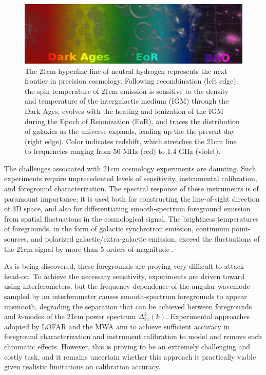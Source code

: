 \documentclass[preprint]{aastex}
\begin{document}
\begin{figure}[!ht]\centering
\includegraphics[width=6in]{plots/21cm_cosmo.jpg}
\caption{\small
The 21cm hyperfine line of neutral hydrogen represents the next frontier in
precision cosmology. Following recombination (left edge), the spin temperature
of 21cm emission is sensitive to the density and temperature of the
intergalactic medium (IGM) through the Dark Ages, evolves with the heating and
ionization of the IGM during the Epoch of Reionization (EoR), and
traces the distribution of galaxies as the universe expands,
leading up the the present day (right edge).  Color indicates
redshift, which stretches the 21cm line to frequencies ranging from 50 MHz
(red) to 1.4 GHz (violet).
}\label{fig:21cm_cosmo}
\end{figure}

The challenges associated with 21cm cosmology experiments are daunting.  Such
experiments require unprecedented levels of sensitivity, instrumental
calibration, and foreground characterization.  The spectral response of these
instruments is of paramount importance; it is used both for constructing the
line-of-sight direction of 3D space, and also for differentiating
smooth-spectrum foreground emission from spatial fluctuations in the
cosmological signal. The brightness temperatures of foregrounds, in the form of
galactic synchrotron emission, continuum point-sources, and polarized
galactic/extra-galactic emission, exceed the fluctuations of the 21cm signal by
more than 5 orders of magnitude
\citep{santos_et_al2005,pritchard_loeb2012,pober_et_al2013b}.

As is being discovered, these foregrounds are proving very difficult to attack
head-on.  To achieve the necessary sensitivity, experiments are driven toward
using interferometers, but the frequency dependence of the angular wavemode
sampled by an interferometer causes smooth-spectrum foregrounds to appear
unsmooth, degrading the separation that can be achieved between foregrounds and
$k$-modes of the 21cm power spectrum $\Delta^2_{21}(k)$.  
Experimental approaches adopted by LOFAR and the MWA aim to achieve sufficient
accuracy in foreground characterization and instrument calibration to model and
remove such chromatic effects.  However, this is proving to be an extremely
challenging and costly task, and it remains uncertain whether this approach is
practically viable given realistic limitations on calibration accuracy.
\end{document}
